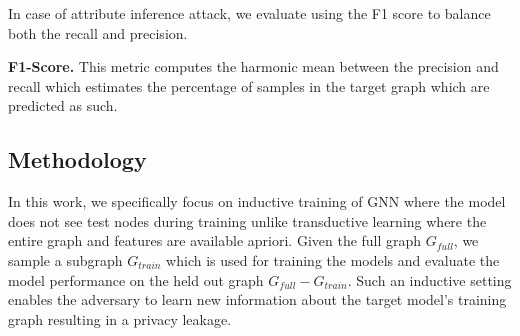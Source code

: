 \noindent In case of attribute inference attack, we evaluate using the F1 score to balance both the recall and precision.

\noindent\textbf{F1-Score.} This metric computes the harmonic mean between the precision and recall which estimates the percentage of samples in the target graph which are predicted as such.

\subsection{Methodology}

In this work, we specifically focus on inductive training of GNN where the model does not see test nodes during training unlike transductive learning where the entire graph and features are available apriori.
Given the full graph $G_{full}$, we sample a subgraph $G_{train}$ which is used for training the models and evaluate the model performance on the held out graph $G_{full}-G_{train}$.
Such an inductive setting enables the adversary to learn new information about the target model's training graph resulting in a privacy leakage.

